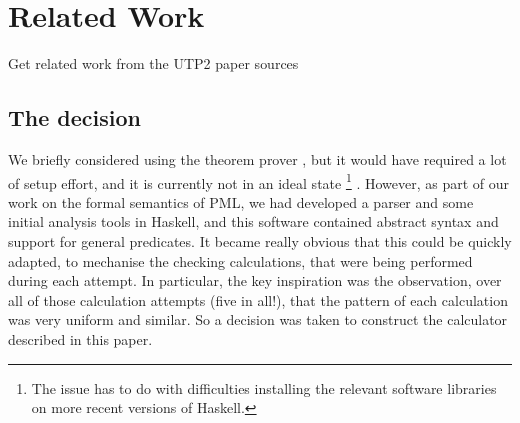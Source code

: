 \section{Related Work}\label{sec:Related}

Get related work from the UTP2 paper sources


\subsection{The decision}

We briefly considered using the  theorem prover
\cite{DBLP:conf/utp/Butterfield10,DBLP:conf/utp/Butterfield12},
but it would have required a lot of setup effort,
and it is currently not in an ideal state%
\footnote{The issue has to do with difficulties installing
the relevant software libraries
on more recent versions of Haskell.}
.
However, as part of our work on the formal semantics of PML,
we had developed a parser and some initial analysis tools
in Haskell\cite{Haskell2010},
and this software contained abstract syntax and support
for general predicates.
It became really obvious that this could be quickly adapted,
to mechanise the checking calculations, that were being performed
during each attempt.
In particular,
the key inspiration was the observation,
over all of those calculation attempts (five in all!),
that the pattern of each calculation was very uniform and similar.
So a decision was taken to construct the calculator described in this paper.
